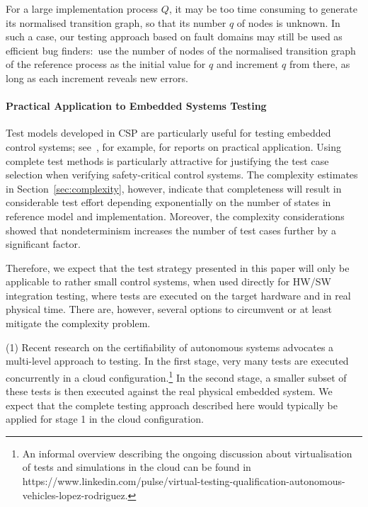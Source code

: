\documentclass[3p,times]{elsarticle}
\begin{document}
For a large implementation process $Q$, it may be too time consuming to
generate its normalised transition graph, so that its number $q$ of nodes is
unknown. In such a case, our testing approach based on fault domains may
still be used as efficient bug finders:~use the number of nodes of the
normalised transition graph of the reference process as the initial value for
$q$ and increment $q$ from there, as long as each increment reveals new
errors.



\paragraph{Practical Application to Embedded Systems Testing}

Test models developed in  CSP  are particularly useful for testing embedded control systems; see~\cite{peleska2002tocs,Peleska02}, for example, for reports on practical application.
Using complete test methods is particularly attractive for justifying the test case selection when
verifying safety-critical control systems. The complexity estimates in Section~\ref{sec:complexity}, however,  
indicate that completeness will result in considerable test effort   depending exponentially
on the number of states in reference model and implementation. Moreover,  the complexity considerations showed that nondeterminism 
increases the number of test cases further by a significant factor. 

Therefore, we expect that
the test strategy presented in this paper will only be applicable to rather small control systems,
when used directly   for   HW/SW integration testing, where tests are executed on the target hardware and in 
real physical time.  There are, however, several options to circumvent or at least mitigate
the complexity problem. 

\medskip
\noindent
(1) Recent research on the certifiability of autonomous systems advocates 
a multi-level approach to testing. In the first stage, very many tests  are executed concurrently
in a cloud configuration.\footnote{An informal overview describing the ongoing discussion about virtualisation of tests and simulations in the cloud can be found in https://www.linkedin.com/pulse/virtual-testing-qualification-autonomous-vehicles-lopez-rodriguez.}   In the second stage, a smaller subset of these tests is then executed against the real physical embedded system.
We expect that the complete testing approach described here would typically be applied for stage 1 in the cloud configuration.   
\end{document}
